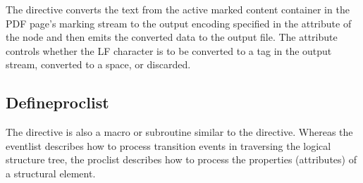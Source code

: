 \documentclass[letterpaper,12pt,english,openany,oneside]{sphinxmanual}
\begin{document}
The  directive converts the text from the active marked content container in the PDF page’s marking stream to the output encoding specified in the  attribute of the  node and then emits the converted data to the output file. The  attribute controls whether the LF character is to be converted to a  tag in the output stream, converted to a space, or discarded.

\begin{sphinxVerbatim}[commandchars=\\\{\}]
\end{sphinxVerbatim}


\subsection{Define\sphinxhyphen{}proc\sphinxhyphen{}list}
\label{\detokenize{index:define-proc-list}}
\begin{sphinxVerbatim}[commandchars=\\\{\}]
   
\end{sphinxVerbatim}

The  directive is also a macro or subroutine similar to the  directive. Whereas the event\sphinxhyphen{}list describes how to process transition events in traversing the logical structure tree, the proc\sphinxhyphen{}list describes how to process the properties (attributes) of a structural element.
\end{document}
